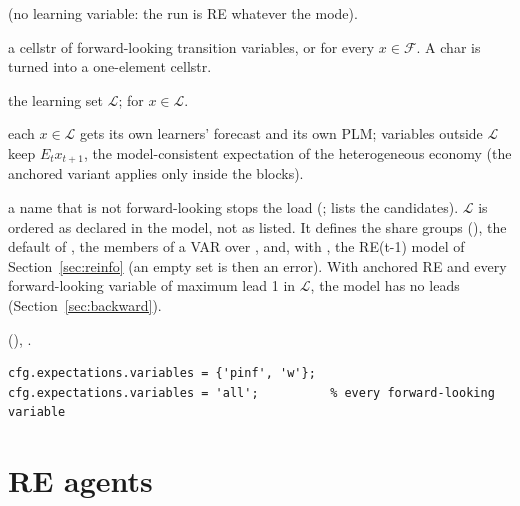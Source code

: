 \documentclass[11pt,a4paper]{article}
\DeclareRobustCommand{\codem}[1]{\texttt{\detokenize{#1}}}
\newenvironment{optspec}%
  {\begin{description}[style=sameline,leftmargin=2.7cm,labelwidth=2.5cm,font=\normalfont\itshape]}%
  {\end{description}}
\begin{document}
\subsubsection{\texorpdfstring{\codem{expectations.variables}}{expectations.variables}}\label{opt:expectations-variables}
\begin{optspec}
  \item[Default] \code{{}} (no learning variable: the run is RE whatever the mode).
  \item[Values] a cellstr of forward-looking transition variables, or  for every
        $x\in\mathcal{F}$. A char is turned into a one-element cellstr.
  \item[Math] the learning set $\mathcal{L}$;  for $x\in\mathcal{L}$.
  \item[Assumptions] each $x\in\mathcal{L}$ gets its own learners' forecast and its own PLM;
        variables outside $\mathcal{L}$ keep $E_t x_{t+1}$, the model-consistent expectation
        of the heterogeneous economy (the anchored variant applies only inside the
         blocks).
  \item[Interactions] a name that is not forward-looking stops the load
        (;  lists the
        candidates). $\mathcal{L}$ is ordered as declared in the model, not as listed. It
        defines the share groups (), the default of
        , the members of a VAR over , and, with
        , the RE(t-1) model of Section~\ref{sec:reinfo}
        (an empty set is then an error). With anchored RE and every forward-looking variable of maximum lead 1 in
        $\mathcal{L}$, the model has no leads (Section~\ref{sec:backward}).
  \item[Code]  (), .
  \item[Example]
\begin{lstlisting}
cfg.expectations.variables = {'pinf', 'w'};
cfg.expectations.variables = 'all';          % every forward-looking variable
\end{lstlisting}
\end{optspec}

\section{RE agents}\label{sec:re}
\end{document}
